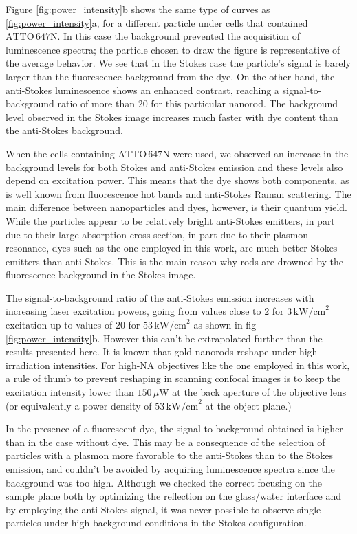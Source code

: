 \documentclass[journal=nalefd,manuscript=letter]{achemso}
\newcommand{\uW}{\ensuremath{\,\mu\textrm{W}}}
\newcommand{\pwr}{\ensuremath{\,\textrm{kW/cm}^2}}
\newcommand{\atto}{\ensuremath{\textrm{ATTO}\,647\textrm{N}}}
\begin{document}
Figure \ref{fig:power_intensity}b shows the same type of curves as
\ref{fig:power_intensity}a, for a different particle under cells that contained
$\atto$. In this case the background prevented the acquisition of luminescence
spectra; the particle chosen to draw the figure is representative of the average
behavior. We see that in the Stokes case the particle's signal is barely larger
than the fluorescence background from the dye. On the other hand, the
anti-Stokes luminescence shows an enhanced contrast, reaching a
signal-to-background ratio of more than $20$ for this particular nanorod. The
background level observed in the Stokes image increases much faster with dye
content than the anti-Stokes background.

When the cells containing $\atto$ were used, we observed an increase in the
background levels for both Stokes and anti-Stokes emission and these levels also
depend on excitation power. This means that the dye shows both
components, as is well known from fluorescence hot bands and anti-Stokes Raman
scattering. The main difference between nanoparticles and dyes, however, is
their quantum yield. While the particles appear to be relatively bright
anti-Stokes emitters, in part due to their large absorption cross section, in
part due to their plasmon resonance, dyes such as the one employed in this work,
are much better Stokes emitters than anti-Stokes. This is the main reason why
rods are drowned by the fluorescence background in the Stokes image.

The signal-to-background ratio of the anti-Stokes emission increases with
increasing laser excitation powers, going from values close to $2$ for $3\pwr$
excitation up to values of $20$ for $53\pwr$ as shown in fig
\ref{fig:power_intensity}b. However this can't be extrapolated further than the
results presented here. It is known that gold nanorods reshape under high
irradiation intensities\cite{Liu2009}. For high-NA objectives like the one
employed in this work, a rule of thumb to prevent reshaping in scanning confocal images is to
keep the excitation intensity lower than $150\uW$ at the back aperture of the
objective lens (or equivalently a power density of $53\pwr$ at the object
plane.)

In the presence of a fluorescent dye, the signal-to-background obtained is
higher than in the case without dye. This may be a consequence of the selection
of particles with a plasmon more favorable to the anti-Stokes than to the Stokes
emission, and couldn't be avoided by acquiring luminescence spectra since the
background was too high. Although we checked the correct focusing on the sample
plane both by optimizing the reflection on the glass/water interface and by
employing the anti-Stokes signal, it was never possible to observe single
particles under high background conditions in the Stokes configuration.
\end{document}
